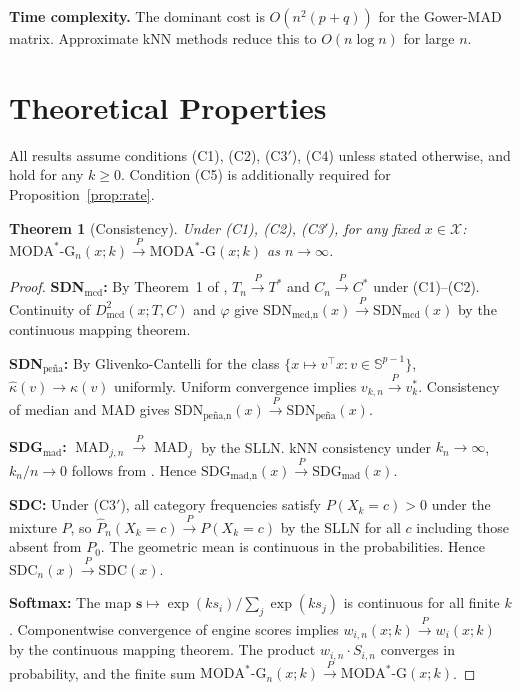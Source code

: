 \documentclass[11pt]{article}
\theoremstyle{plain}
\newtheorem{theorem}{Theorem}
\theoremstyle{definition}
\DeclareMathOperator{\MAD}{MAD}
\newcommand{\X}{\mathcal{X}}
\newcommand{\inprob}{\xrightarrow{P}}
\newcommand{\moda}{\text{MODA}^*\text{-G}}
\begin{document}
\noindent\textbf{Time complexity.} The dominant cost is
$O(n^2(p+q))$ for the Gower-MAD matrix. Approximate kNN
methods reduce this to $O(n\log n)$ for large $n$.

\section{Theoretical Properties}
\label{sec:theory}

All results assume conditions (C1), (C2), (C3$'$), (C4)
unless stated otherwise, and hold for any $k \geq 0$.
Condition (C5) is additionally required for
Proposition~\ref{prop:rate}.

\begin{theorem}[Consistency]
\label{thm:consistency}
Under (C1), (C2), (C3$'$), for any fixed $x \in \X$:
$\moda_n(x; k) \inprob \moda(x; k)$ as $n \to \infty$.
\end{theorem}

\begin{proof}
\textbf{SDN$_\text{mcd}$:} By Theorem~1 of
\citet{rousseeuw1999}, $T_n \inprob T^*$ and
$C_n \inprob C^*$ under (C1)--(C2). Continuity of
$D_\text{mcd}^2(x; T, C)$ and $\varphi$ give
$\text{SDN}_\text{mcd,n}(x) \inprob
\text{SDN}_\text{mcd}(x)$ by the continuous mapping
theorem.

\textbf{SDN$_\text{pe\~{n}a}$:} By Glivenko-Cantelli
for the class $\{x \mapsto v^\top x : v \in
\mathbb{S}^{p-1}\}$, $\hat{\kappa}(v) \to \kappa(v)$
uniformly. Uniform convergence implies $v_{k,n} \inprob
v_k^*$. Consistency of median and MAD gives
$\text{SDN}_\text{pe\~{n}a,n}(x) \inprob
\text{SDN}_\text{pe\~{n}a}(x)$.

\textbf{SDG$_\text{mad}$:} $\MAD_{j,n} \inprob \MAD_j$
by the SLLN. kNN consistency under $k_n \to \infty$,
$k_n/n \to 0$ follows from \citet{devroye1996}. Hence
$\text{SDG}_\text{mad,n}(x) \inprob
\text{SDG}_\text{mad}(x)$.

\textbf{SDC:} Under (C3$'$), all category frequencies
satisfy $P(X_k = c) > 0$ under the mixture $P$, so
$\hat{P}_n(X_k = c) \inprob P(X_k = c)$ by the SLLN
for all $c$ including those absent from $P_0$. The
geometric mean is continuous in the probabilities.
Hence $\text{SDC}_n(x) \inprob \text{SDC}(x)$.

\textbf{Softmax:} The map $\mathbf{s} \mapsto
\exp(ks_i)/\sum_j \exp(ks_j)$ is continuous for all
finite $k$. Componentwise convergence of engine scores
implies $w_{i,n}(x;k) \inprob w_i(x;k)$ by the
continuous mapping theorem. The product
$w_{i,n} \cdot S_{i,n}$ converges in probability, and
the finite sum $\moda_n(x;k) \inprob \moda(x;k)$.
\end{proof}
\end{document}
